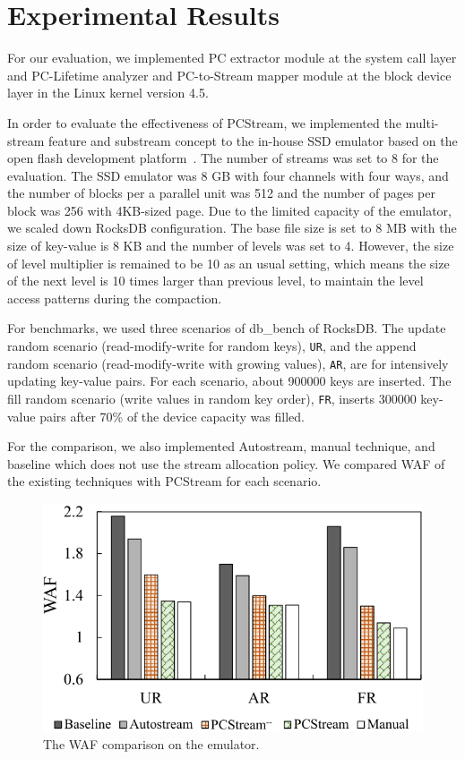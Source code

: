 \section{Experimental Results}
For our evaluation, we implemented PC extractor module at the 
system call layer 
and PC-Lifetime analyzer and PC-to-Stream mapper module 
at the block device layer in the Linux kernel version 4.5.

In order to evaluate the effectiveness of {\sf PCStream},
we implemented the multi-stream feature and substream concept
to the in-house SSD emulator
based on the open flash development platform~\cite{AMF}.
The number of streams was set to 8 for the evaluation.
The SSD emulator was 8 GB with four channels with four ways, and 
the number of blocks per a parallel unit was 512 and
the number of pages per block was 256 with 4KB-sized page.
Due to the limited capacity of the emulator, 
we scaled down RocksDB configuration.
The base file size is set to 8 MB
with the size of key-value is 8 KB and the number of levels was set to 4.
However, the size of level multiplier is remained to be 10 as an usual setting,
which means the size of the next level is 10 times larger than previous level,
to maintain the level access patterns during the compaction.

For benchmarks, we used three scenarios of db\_bench of RocksDB.
The update random scenario (read-modify-write for random keys), {\tt UR}, and 
the append random scenario (read-modify-write with growing values), {\tt AR}, are
for intensively updating key-value pairs.
For each scenario, about 900000 keys are inserted.
The fill random scenario (write values in random key order), {\tt FR}, 
inserts 300000 key-value pairs 
after 70\% of the device capacity was filled.

For the comparison, 
we also implemented Autostream, manual technique, and
baseline which does not use the stream allocation policy.
We compared WAF of the existing techniques with {\sf PCStream}
for each scenario.

\begin{figure}[t]
	\centering
	\includegraphics[width=0.8\linewidth]{figure/result_emul}
	\vspace{-10pt}
	\caption{The WAF comparison on the emulator.}
	\label{fig:result_emul}
	\vspace{-15pt}
\end{figure}

